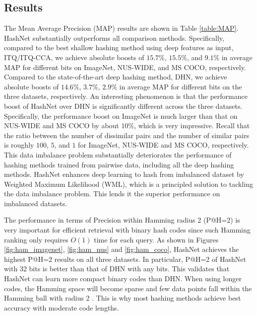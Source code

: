 \documentclass[10pt,twocolumn,letterpaper]{article}
\begin{document}
\subsection{Results}
The Mean Average Precision (MAP) results are shown in Table \ref{table:MAP}. HashNet substantially outperforms all comparison methods. Specifically, compared to the best shallow hashing method using deep features as input, ITQ/ITQ-CCA, we achieve absolute boosts of $15.7\%$, $15.5\%$, and $9.1\%$ in average MAP for different bits on ImageNet, NUS-WIDE, and MS COCO, respectively. Compared to the state-of-the-art deep hashing method, DHN, we achieve absolute boosts of $14.6\%$, $3.7\%$, $2.9\%$ in average MAP for different bits on the three datasets, respectively. An interesting phenomenon is that the performance boost of HashNet over DHN is significantly different across the three datasets. Specifically, the performance boost on ImageNet is much larger than that on NUS-WIDE and MS COCO by about $10\%$, which is very impressive. Recall that the ratio between the number of dissimilar pairs and the number of similar pairs is roughly $100$, $5$, and $1$ for ImageNet, NUS-WIDE and MS COCO, respectively. This data imbalance problem substantially deteriorates the performance of hashing methods trained from pairwise data, including all the deep hashing methods. HashNet enhances deep learning to hash from imbalanced dataset by Weighted Maximum Likelihood (WML), which is a principled solution to tackling the data imbalance problem. This lends it the superior performance on imbalanced datasets. 

The performance in terms of Precision within Hamming radius 2 (P@H=2) is very important for efficient retrieval with binary hash codes since such Hamming ranking only requires $O(1)$ time for each query. As shown in Figures \ref{fig:ham_imagenet}, \ref{fig:ham_nus} and \ref{fig:ham_coco}, HashNet achieves the highest P@H=2 results on all three datasets. In particular, P@H=2 of HashNet with 32 bits is better than that of DHN with any bits. This validates that HashNet can learn more compact binary codes than DHN. When using longer codes, the Hamming space will become sparse and few data points fall within the Hamming ball with radius 2 \cite{cite:CVPR12MIH}. This is why most hashing methods achieve best accuracy with moderate code lengths.
\end{document}

